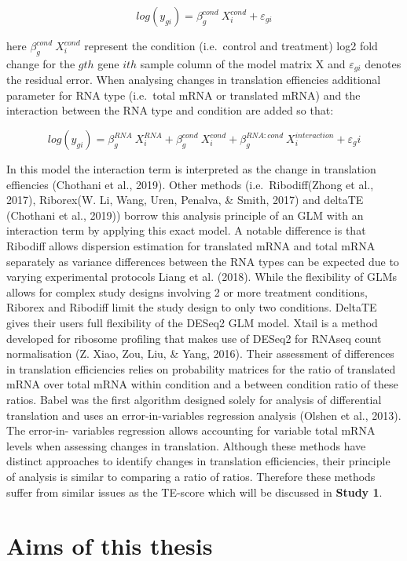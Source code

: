 \documentclass[
  12pt,
  openany]{book}
\begin{document}
\[log(y_{gi}) = \beta_g^{cond}\ X_i^{cond} + \varepsilon_{gi}\]

here \(\beta_g^{cond}\ X_i^{cond}\) represent the condition (i.e.~control and treatment) log2 fold change for the \(gth\) gene \(ith\) sample column of the model matrix X and \(\varepsilon_{gi}\) denotes the residual error. When analysing changes in translation effiencies additional parameter for RNA type (i.e.~total mRNA or translated mRNA) and the interaction between the RNA type and condition are added so that:

\[log(y_{gi}) = \beta_g^{RNA}\ X_i^{RNA}+ \beta_g^{cond}\ X_i^{cond} + \beta_g^{RNA:cond}\ X_i^{interaction} + \varepsilon_gi\]

In this model the interaction term is interpreted as the change in translation effiencies (Chothani et al., 2019). Other methods (i.e.~Ribodiff(Zhong et al., 2017), Riborex(W. Li, Wang, Uren, Penalva, \& Smith, 2017) and deltaTE (Chothani et al., 2019)) borrow this analysis principle of an GLM with an interaction term by applying this exact model. A notable difference is that Ribodiff allows dispersion estimation for translated mRNA and total mRNA separately as variance differences between the RNA types can be expected due to varying experimental protocols Liang et al. (2018). While the flexibility of GLMs allows for complex study designs involving 2 or more treatment conditions, Riborex and Ribodiff limit the study design to only two conditions. DeltaTE gives their users full flexibility of the DESeq2 GLM model. Xtail is a method developed for ribosome profiling that makes use of DESeq2 for RNAseq count normalisation (Z. Xiao, Zou, Liu, \& Yang, 2016). Their assessment of differences in translation efficiencies relies on probability matrices for the ratio of translated mRNA over total mRNA within condition and a between condition ratio of these ratios. Babel was the first algorithm designed solely for analysis of differential translation and uses an error-in-variables regression analysis (Olshen et al., 2013). The error-in- variables regression allows accounting for variable total mRNA levels when assessing changes in translation. Although these methods have distinct approaches to identify changes in translation efficiencies, their principle of analysis is similar to comparing a ratio of ratios. Therefore these methods suffer from similar issues as the TE-score which will be discussed in \textbf{Study 1}.

\chapter{Aims of this thesis}
\end{document}
